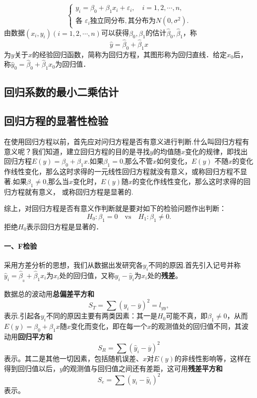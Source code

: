 \begin{equation}
    \begin{cases}
        y_i=\beta_0+\beta_1x_i+\varepsilon_i,\quad i=1,2,\cdots,n, \\
        \text{各 }\varepsilon_i\text{独立同分布},\text{其分布为}N(0,\sigma^2).
    \end{cases}
\end{equation}
由数据$(x_{i},y_{i})(i=1,2,\cdots,n)$可以获得$\beta_0,\beta_1$的估计$\hat{\beta}_0,\hat{\beta}_1$，称
\begin{equation}
    \hat{y}=\hat{\beta}_0+\hat{\beta}_1x
\end{equation}
为$y$关于$x$的经验回归函数，简称为回归方程，其图形称为回归直线．给定$x_0$后，称$\hat{y}_0=\hat{\beta}_0+\hat{\beta}_1x_0$为回归值．

\subsection{回归系数的最小二乘估计}
\subsection{回归方程的显著性检验}
在使用回归方程以前，首先应对问归方程是否有意义进行判断.什么叫回归方程有意义呢？我们知道，建立回归方程的目的是寻找$y$的均值随$x$变化的规律，即找出回归方程$E(y)=\beta_0+\beta_1x$.如果$\beta_1=0$,那么不管$x$如何变化，$E(y)$ 不随$x$的变化作线性变化，那么这时求得的一元线性回归方程就没有意义，或称回归方程不显著.如果$\beta_{1}\neq 0$,那么当$x$变化时，$E(y)$随$x$的变化作线性变化，那么这时求得的回归方程就有意义， 或称回归方程是显著的.

综上，对回归方程是否有意义作判断就是要对如下的检验问题作出判断：
\begin{equation}
    \label{eq:8.4.10}
    H_0:\beta_1=0\quad \text{vs}\quad H_1:\beta_1\neq 0.
\end{equation}
拒绝$H_0$表示回归方程是显著的．

\paragraph{一、F检验}
采用方差分析的思想，我们从数据出发研究各$y_i$不同的原因.首先引入记号并称$\hat{y}_{i}=\hat{\beta}_{_0}+\hat{\beta}_{1}x_{i}$为$x_i$处的回归值，又称$y_i-\hat{y}_i$为$x_i$处的\textbf{残差}。

数据总的波动用\textbf{总偏差平方和}
$$S_{T}=\sum(y_{i}-\overline{y})^{2}=l_{yy},$$
表示.引起各$y_i$不同的原因主要有两类因素：其一是$H_0$可能不真，即$\beta_1 \neq 0$，从而$E(y)=\beta_0+\beta_1 x$随$x$变化而变化，即在每一个$x$的观测值处的回归值不同，其波动用\textbf{回归平方和}
\begin{equation}
    S_R = \sum (\hat{y}_i - \overline{y})^2
\end{equation}
表示。其二是其他一切因素，包括随机误差、$x$对$E(y)$的非线性影响等，这样在得到回归值以后，$y$的观测值与回归值之间还有差距，这可用\textbf{残差平方和}
\begin{equation}
    S_e = \sum (y_i - \hat{y}_i)^2
\end{equation}
表示。


